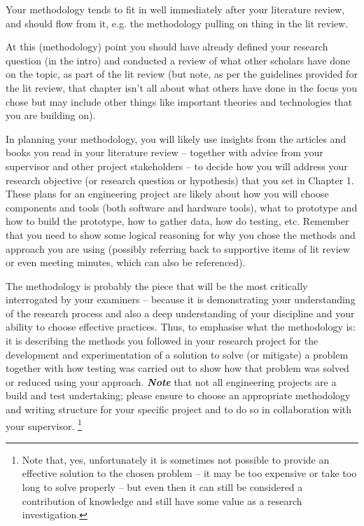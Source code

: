 
Your methodology tends to fit in well immediately after your literature review, and should flow from it, e.g. the methodology pulling on thing in the lit review.

At this (methodology) point you should have already defined your research question (in the intro) and conducted a review of what other scholars have done on the topic, as part of the lit review (but note, as per the guidelines provided for the lit review, that chapter isn't all about what others have done in the focus you chose but may include other things like important theories and technologies that you are building on). 

In planning your methodology, you will likely use insights from the articles and books you read in your literature review -- together with advice from your supervisor and other project stakeholders -- to decide how you will address your research objective (or research question or hypothesis) that you set in Chapter 1. These plans for an engineering project are likely about how you will choose components and tools (both software and hardware tools), what to prototype and how to build the prototype, how to gather data, how do testing, etc. Remember that you need to show some logical reasoning for why you chose the methods and approach you are using (possibly referring back to supportive items of lit review or even meeting minutes, which can also be referenced).

The methodology is probably the piece that will be the most critically interrogated by your examiners -- because it is demonstrating your understanding of the research process and also a deep understanding of your discipline and your ability to choose effective practices.  Thus, to emphasise what the methodology is: it is describing the methods you followed in your research project for the development and experimentation of a solution to solve (or mitigate) a problem together with how testing was carried out to show how that problem was solved or reduced using your approach. \textbf{\textit{Note}} that not all engineering projects are a build and test undertaking; please ensure to choose an appropriate methodology and writing structure for your specific project and to do so in collaboration with your supervisor. \footnote{Note that, yes, unfortunately it is sometimes not possible to provide an effective solution to the chosen problem -- it may be too expensive or take too long to solve properly -- but even then it can still be considered a contribution of knowledge and still have some value as a research investigation.}

